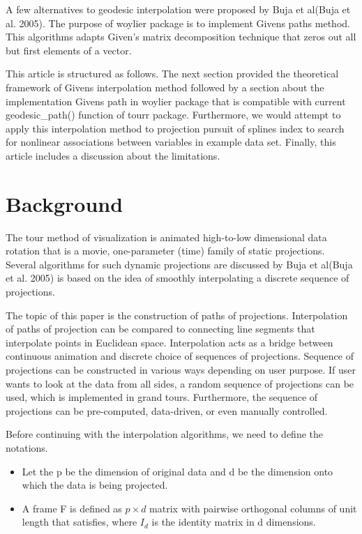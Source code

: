 A few alternatives to geodesic interpolation were proposed by Buja et al(Buja et al. 2005). The purpose of woylier package is to implement Givens paths method. This algorithms adapts Given's matrix decomposition technique that zeros out all but first elements of a vector.

This article is structured as follows. The next section provided the theoretical framework of Givens interpolation method followed by a section about the implementation Givens path in woylier package that is compatible with current geodesic\_path() function of tourr package. Furthermore, we would attempt to apply this interpolation method to projection pursuit of splines index to search for nonlinear associations between variables in example data set. Finally, this article includes a discussion about the limitations.

\hypertarget{background}{%
\section{Background}\label{background}}

The tour method of visualization is animated high-to-low dimensional data rotation that is a movie, one-parameter (time) family of static projections. Several algorithms for such dynamic projections are discussed by Buja et al(Buja et al. 2005) is based on the idea of smoothly interpolating a discrete sequence of projections.

The topic of this paper is the construction of paths of projections. Interpolation of paths of projection can be compared to connecting line segments that interpolate points in Euclidean space. Interpolation acts as a bridge between continuous animation and discrete choice of sequences of projections. Sequence of projections can be constructed in various ways depending on user purpose. If user wants to look at the data from all sides, a random sequence of projections can be used, which is implemented in grand tours. Furthermore, the sequence of projections can be pre-computed, data-driven, or even manually controlled.

Before continuing with the interpolation algorithms, we need to define the notations.

\begin{itemize}
\tightlist
\item
  Let the p be the dimension of original data and d be the dimension onto which the data is being projected.
\item
  A frame F is defined as \(p\times d\) matrix with pairwise orthogonal columns of unit length that satisfies, where \(I_d\) is the identity matrix in d dimensions.
\end{itemize}


